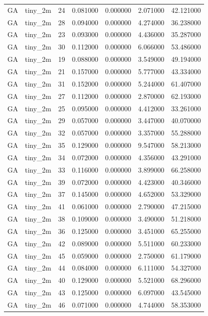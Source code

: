 \begin{tabular}{llrrrrr}
GA & tiny_2m & 24 & 0.081000 & 0.000000 & 2.071000 & 42.121000 \\
GA & tiny_2m & 28 & 0.094000 & 0.000000 & 4.274000 & 36.238000 \\
GA & tiny_2m & 23 & 0.093000 & 0.000000 & 4.436000 & 35.287000 \\
GA & tiny_2m & 30 & 0.112000 & 0.000000 & 6.066000 & 53.486000 \\
GA & tiny_2m & 19 & 0.088000 & 0.000000 & 3.549000 & 49.194000 \\
GA & tiny_2m & 21 & 0.157000 & 0.000000 & 5.777000 & 43.334000 \\
GA & tiny_2m & 31 & 0.152000 & 0.000000 & 5.244000 & 61.407000 \\
GA & tiny_2m & 27 & 0.112000 & 0.000000 & 2.870000 & 62.193000 \\
GA & tiny_2m & 25 & 0.095000 & 0.000000 & 4.412000 & 33.261000 \\
GA & tiny_2m & 29 & 0.057000 & 0.000000 & 3.447000 & 40.070000 \\
GA & tiny_2m & 32 & 0.057000 & 0.000000 & 3.357000 & 55.288000 \\
GA & tiny_2m & 35 & 0.129000 & 0.000000 & 9.547000 & 58.213000 \\
GA & tiny_2m & 34 & 0.072000 & 0.000000 & 4.356000 & 43.291000 \\
GA & tiny_2m & 33 & 0.116000 & 0.000000 & 3.899000 & 66.258000 \\
GA & tiny_2m & 39 & 0.072000 & 0.000000 & 4.423000 & 40.346000 \\
GA & tiny_2m & 37 & 0.145000 & 0.000000 & 4.652000 & 53.329000 \\
GA & tiny_2m & 41 & 0.061000 & 0.000000 & 2.790000 & 47.215000 \\
GA & tiny_2m & 38 & 0.109000 & 0.000000 & 3.490000 & 51.218000 \\
GA & tiny_2m & 36 & 0.125000 & 0.000000 & 3.451000 & 65.255000 \\
GA & tiny_2m & 42 & 0.089000 & 0.000000 & 5.511000 & 60.233000 \\
GA & tiny_2m & 45 & 0.059000 & 0.000000 & 2.750000 & 61.179000 \\
GA & tiny_2m & 44 & 0.084000 & 0.000000 & 6.111000 & 54.327000 \\
GA & tiny_2m & 40 & 0.129000 & 0.000000 & 5.521000 & 68.296000 \\
GA & tiny_2m & 43 & 0.125000 & 0.000000 & 6.097000 & 43.545000 \\
GA & tiny_2m & 46 & 0.071000 & 0.000000 & 4.744000 & 58.353000 \\

\end{tabular}
